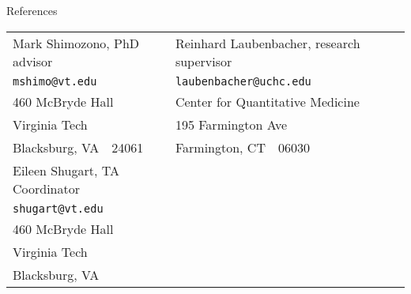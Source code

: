 \documentclass[10pt,a4paper]{article}
\begin{document}
\vspace{.25cm}
{\sc References}\\[1ex]%
\begin{tabularx}{\textwidth}{Xll}
Mark Shimozono, PhD advisor & Reinhard Laubenbacher, research supervisor \\
{\tt\small mshimo@vt.edu} & {\tt\small laubenbacher@uchc.edu} \\
460 McBryde Hall & Center for Quantitative Medicine \\
Virginia Tech & 195 Farmington Ave \\
Blacksburg, VA\ \ 24061 &  Farmington, CT\ \ 06030 \\[1ex]
Eileen Shugart, TA Coordinator \\
{\tt\small shugart@vt.edu} \\
460 McBryde Hall \\
Virginia Tech \\
Blacksburg, VA
\end{tabularx}

\fi
\end{document}

